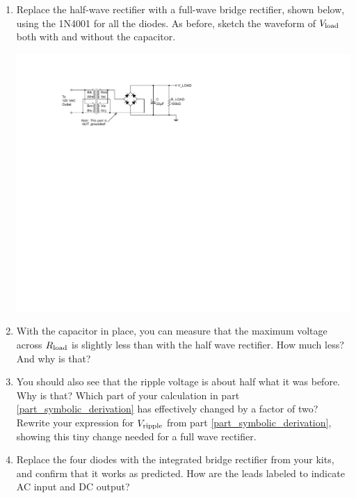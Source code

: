 \begin{enumerate}[wide]
\item Replace the half-wave rectifier with a full-wave bridge rectifier, shown below, using the 1N4001 for all the diodes.  As before, sketch the waveform of $V_{\rm load}$ both with and without the capacitor. \label{part_full_wave_bridge_rectifier}
\begin{center}
\includegraphics{power_supply/full_wave_bridge_rectifier.pdf}
\end{center}

\item With the capacitor in place, you can measure that the maximum voltage across $R_{\rm load}$ is slightly less than with the half wave rectifier.  How much less?  And why is that?

\item You should also see that the ripple voltage is about half what it was before.  Why is that?  Which part of your calculation in part \ref{part_symbolic_derivation} has effectively changed by a factor of two?  Rewrite your expression for $V_{\rm ripple}$ from part \ref{part_symbolic_derivation}, showing this tiny change needed for a full wave rectifier.  \label{part_symbolic_derivation_2f}

\item Replace the four diodes with the integrated bridge rectifier from your kits, and confirm that it works as predicted.  How are the leads labeled to indicate AC input and DC output?


\end{enumerate}
